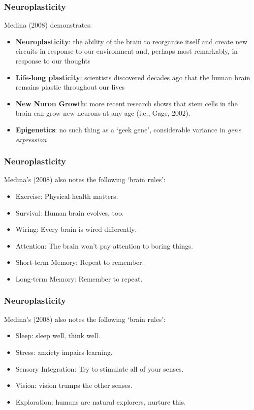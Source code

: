 \begin{frame}
	\frametitle{Neuroplasticity}
	
	Medina (2008) demonstrates:
	
	\begin{itemize}
		\item \textbf{Neuroplasticity}: the ability of the brain to reorganise itself and 
		create new circuits in response to our environment and, perhaps most remarkably,
		 in response to our thoughts
		\item \textbf{Life-long plasticity}: scientists discovered decades ago that the human
		brain remains plastic throughout our lives
		\item \textbf{New Nuron Growth}: more recent research shows that stem cells in the brain
		can grow new neurons at any age (i.e., Gage, 2002).
		\item \textbf{Epigenetics}: no such thing as a `geek gene', considerable
		variance in \textit{gene expression}
	\end{itemize}
\end{frame}

\begin{frame}
	\frametitle{Neuroplasticity}
	
	Medina's (2008) also notes the following `brain rules':
	
	\begin{itemize}
		\item Exercise: Physical health matters.
		\item Survival: Human brain evolves, too.
		\item Wiring: Every brain is wired differently.
		\item Attention: The brain won't pay attention to boring things.
		\item Short-term Memory: Repeat to remember.
		\item Long-term Memory: Remember to repeat.
	\end{itemize}
\end{frame}

\begin{frame}
	\frametitle{Neuroplasticity}
	
	Medina's (2008) also notes the following `brain rules':
	
	\begin{itemize}
		\item Sleep: sleep well, think well.
		\item Stress: anxiety impairs learning.
		\item Sensory Integration: Try to stimulate all of your senses.
		\item Vision: vision trumps the other senses.
		\item Exploration: humans are natural explorers, nurture this.
	\end{itemize}
\end{frame}

